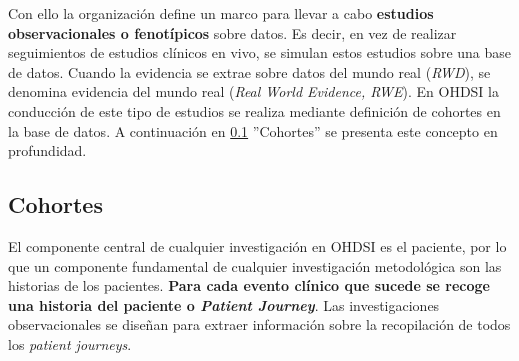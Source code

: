 
Con ello la organización define un marco para llevar a cabo \textbf{estudios observacionales o fenotípicos} sobre datos. Es decir, en vez de realizar seguimientos de estudios clínicos en vivo, se simulan estos estudios sobre una base de datos. Cuando la evidencia se extrae sobre datos del mundo real (\textit{RWD}), se denomina evidencia del mundo real (\textit{Real World Evidence, RWE}). En OHDSI la conducción de este tipo de estudios se realiza mediante definición de cohortes en la base de datos. A continuación en \ref{subsec:05cohortes} ''Cohortes'' se presenta este concepto en profundidad.



\subsection{Cohortes} \label{subsec:05cohortes}


El componente central de cualquier investigación en OHDSI es el paciente, por lo que un componente fundamental de cualquier investigación metodológica son las historias de los pacientes. \textbf{Para cada evento clínico que sucede se recoge una historia del paciente o \textit{Patient Journey}}. %
Las investigaciones observacionales se diseñan para extraer información sobre la recopilación de todos los \textit{patient journeys}.

